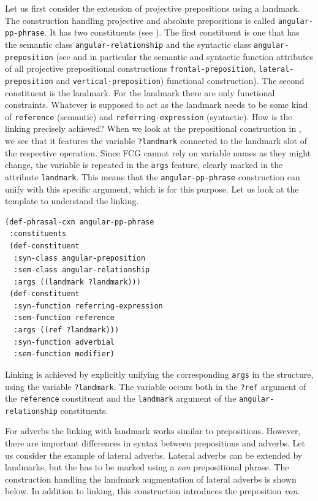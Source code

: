 Let us first consider the extension of projective prepositions 
using a landmark. The construction handling projective and absolute 
prepositions is called {\footnotesize\tt angular-pp-phrase}. It has two constituents
(see ). 
The first constituent is one that has the semantic 
class {\footnotesize\tt angular-relationship} and the syntactic class 
{\footnotesize\tt angular-preposition} (see  and in particular the semantic and 
syntactic function attributes of all projective 
prepositional constructions {\footnotesize\tt frontal-preposition},
{\footnotesize\tt lateral-preposition} and {\footnotesize\tt vertical-preposition})
functional construction). The second constituent is 
the landmark. For the landmark there are only functional constraints. 
Whatever is supposed to act as the landmark needs to be some kind of
{\footnotesize\tt reference} (semantic) and {\footnotesize\tt referring-expression} (syntactic). 
How is the linking precisely achieved? 
When we look at the prepositional construction in %
, we see that it features the variable 
{\footnotesize\tt ?landmark} connected to the landmark slot of the respective 
operation. Since FCG cannot rely on variable names as they 
might change, the variable is repeated in the {\footnotesize\tt args} feature, 
clearly marked in the attribute {\footnotesize\tt landmark}. 
This means that the {\footnotesize\tt angular-pp-phrase} construction
can unify with this specific argument, which is for this purpose. 
Let us look at the template to understand the linking.

\ea
\begin{lstlisting}
(def-phrasal-cxn angular-pp-phrase
 :constituents
 (def-constituent
  :syn-class angular-preposition 
  :sem-class angular-relationship
  :args ((landmark ?landmark)))
 (def-constituent
  :syn-function referring-expression
  :sem-function reference
  :args ((ref ?landmark)))
  :syn-function adverbial
  :sem-function modifier)
\end{lstlisting}
\label{e:angular-pp-phrase}
\z
Linking is achieved by explicitly unifying the corresponding 
{\footnotesize\tt args} in the structure, using the variable
{\footnotesize\tt ?landmark}. The variable occurs both in the {\footnotesize\tt ?ref} 
argument of the {\footnotesize\tt reference} constituent 
and the {\footnotesize\tt landmark} argument of the 
{\footnotesize\tt angular-relationship} constituents. 


For adverbs the linking with landmark works similar to prepositions. 
However, there are important differences in syntax between prepositions
and adverbs. Let us consider the example of lateral adverbs.
Lateral adverbs can be extended by landmarks, but the has to 
be marked using a \textit{von} prepositional phrase. 
The construction handling the landmark augmentation of lateral adverbs 
is shown below. In addition to linking, this construction introduces
the preposition \textit{von}. 



